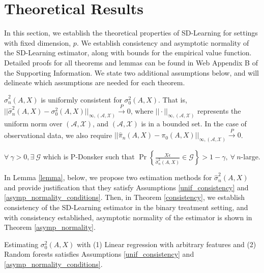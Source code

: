 \documentclass[useAMS,usenatbib]{biom}
\begin{document}
\section{Theoretical Results} \label{sec_theory}

In this section, we establish the theoretical properties of SD-Learning for settings with fixed dimension, $p$. We establish consistency and asymptotic normality of the SD-Learning estimator, along with bounds for the empirical value function. Detailed proofs for all theorems and lemmas can be found in Web Appendix B of the Supporting Information. We state two additional assumptions below, and will delineate which assumptions are needed for each theorem.

\begin{assumption} \label{unif_consistency}
$\hat{\sigma}_n^2(A,X)$ is uniformly consistent for $\sigma_0^2(A,X)$. That is, $||\hat{\sigma}_n^2(A,X) - \sigma_0^2(A,X)||_{\infty, \left( \mathcal{A}, \mathcal{X} \right)} \overset{P}{\rightarrow} 0$, where $|| \cdot ||_{\infty, \left( \mathcal{A}, \mathcal{X} \right)}$ represents the uniform norm over $(\mathcal{A}, \mathcal{X})$, and $(\mathcal{A}, \mathcal{X})$ is in a bounded set. In the case of observational data, we also require $||\hat{\pi}_n(A,X) - \pi_0(A,X)||_{\infty, \left( \mathcal{A}, \mathcal{X} \right)} \overset{P}{\rightarrow} 0$.
\end{assumption}

\begin{assumption} \label{asymp_normality_conditions}
$\forall\ \gamma > 0, \exists\ \mathcal{G}$ which is P-Donsker such that $\Pr \left\{ \frac{X \epsilon}{\hat{\sigma}_n^2(A, X)} \in \mathcal{G} \right\} > 1 - \gamma,\ \forall\ n$-large.
\end{assumption}

In Lemma \ref{lemma}, below, we propose two estimation methods for $\hat{\sigma}_n^2(A,X)$ and provide justification that they satisfy Assumptions \ref{unif_consistency} and \ref{asymp_normality_conditions}. Then, in Theorem \ref{consistency}, we establish consistency of the SD-Learning estimator in the binary treatment setting, and with consistency established, asymptotic normality of the estimator is shown in Theorem \ref{asymp_normality}. 

\begin{lemma} \label{lemma}
Estimating $\sigma_0^2(A,X)$ with (1) Linear regression with arbitrary features and (2) Random forests satisfies Assumptions \ref{unif_consistency} and \ref{asymp_normality_conditions}.
\end{lemma}
\end{document}
